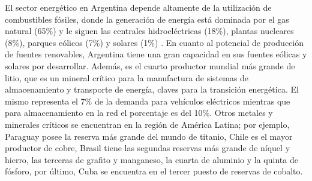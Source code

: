 El sector energético en Argentina depende altamente de la utilización de 
combustibles fósiles, donde la generación de energía está dominada por el gas 
natural (65\%) y le siguen las centrales hidroeléctricas (18\%), plantas nucleares
(8\%), parques eólicos (7\%) y solares (1\%) \cite{IEA}. En cuanto al potencial de 
producción de fuentes renovables, Argentina tiene una gran capacidad en sus 
fuentes eólicas y solares por desarrollar. Además, es el cuarto productor mundial más 
grande de litio, que es un mineral crítico para la manufactura de sistemas de 
almacenamiento y transporte de energía, claves para la transición energética. 
El mismo representa el 7\% de la demanda para vehículos eléctricos mientras que 
para almacenamiento en la red el porcentaje es del 10\%. Otros metales y 
minerales críticos se encuentran en la región de América Latina; por ejemplo, 
Paraguay posee la reserva más grande del mundo de titanio, Chile es el mayor 
productor de cobre, Brasil tiene las segundas reservas más grande de níquel y
hierro, las terceras de grafito y manganeso, la cuarta de aluminio y la quinta de 
fósforo, por último, Cuba se encuentra en el tercer puesto de reservas de cobalto.

